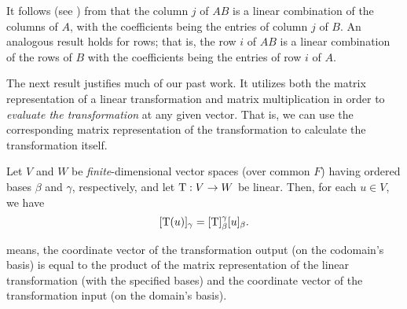 \begin{remark} \label{remark 2.3.6}
It follows (see ) from  that the column \(j\) of \(AB\) is a linear combination of the columns of \(A\), with the coefficients being the entries of column \(j\) of \(B\).
An analogous result holds for rows; that is, the row \(i\) of \(AB\) is a linear combination of the rows of \(B\) with
the coefficients being the entries of row \(i\) of \(A\).
\end{remark}

The next result justifies much of our past work.
It utilizes both the matrix representation of a linear transformation and matrix multiplication in order
to \emph{evaluate the transformation} at any given vector.
That is, we can use the corresponding matrix representation of the transformation to calculate the transformation itself.

\begin{theorem} \label{thm 2.14}
Let \(V\) and \(W\) be \emph{finite}-dimensional vector spaces (over common \(F\)) having ordered bases \(\beta\) and \(\gamma\), respectively, and let \(\mathrm{T} : V \to W\) be linear.
Then, for each \(u \in V\), we have
\[
    [\mathrm{T}(u)]_{\gamma} = [\mathrm{T}]_{\beta}^{\gamma}[u]_{\beta}.
\]
\end{theorem}

\begin{note}
 means, the coordinate vector of the transformation output (on the codomain's basis) is equal to the product of the matrix representation of the linear transformation (with the specified bases) and the coordinate vector of the transformation input (on the domain's basis).
\end{note}

